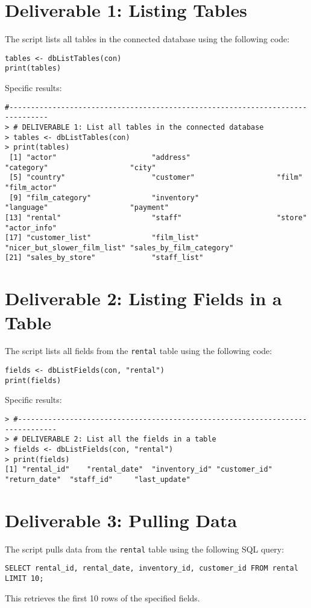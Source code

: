 \documentclass[a4paper,11pt]{extarticle}
\begin{document}
\section*{Deliverable 1: Listing Tables}
The script lists all tables in the connected database using the following code:
\begin{verbatim}
tables <- dbListTables(con)
print(tables)
\end{verbatim}
Specific results:
\begin{verbatim}
#-------------------------------------------------------------------------------
> # DELIVERABLE 1: List all tables in the connected database
> tables <- dbListTables(con)
> print(tables)
 [1] "actor"                      "address"                    "category"                   "city"                      
 [5] "country"                    "customer"                   "film"                       "film_actor"                
 [9] "film_category"              "inventory"                  "language"                   "payment"                   
[13] "rental"                     "staff"                      "store"                      "actor_info"                
[17] "customer_list"              "film_list"                  "nicer_but_slower_film_list" "sales_by_film_category"    
[21] "sales_by_store"             "staff_list"  
\end{verbatim}

\vspace{2cm}
\section*{Deliverable 2: Listing Fields in a Table}
The script lists all fields from the \texttt{rental} table using the following code:
\begin{verbatim}
fields <- dbListFields(con, "rental")
print(fields)
\end{verbatim}
Specific results:
\begin{verbatim}
> #-------------------------------------------------------------------------------
> # DELIVERABLE 2: List all the fields in a table
> fields <- dbListFields(con, "rental")
> print(fields)
[1] "rental_id"    "rental_date"  "inventory_id" "customer_id"  "return_date"  "staff_id"     "last_update"     
\end{verbatim}
\newpage 
\section*{Deliverable 3: Pulling Data}
The script pulls data from the \texttt{rental} table using the following SQL query:
\begin{verbatim}
SELECT rental_id, rental_date, inventory_id, customer_id FROM rental LIMIT 10;
\end{verbatim}
This retrieves the first 10 rows of the specified fields.
\end{document}
